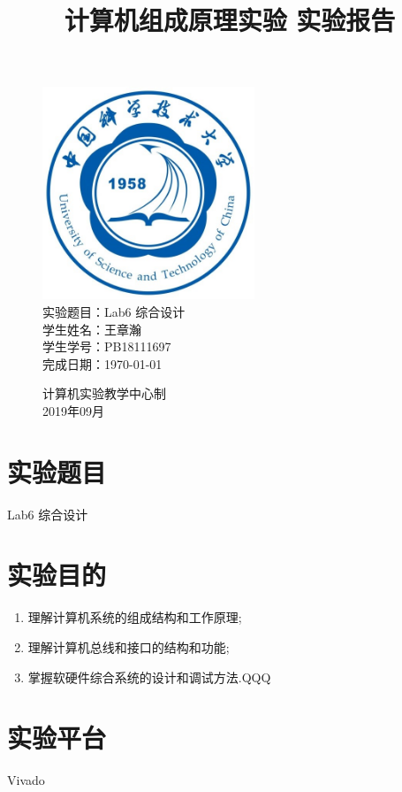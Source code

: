\documentclass[UTF8]{article}
\title{计算机组成原理实验 实验报告}
\date{}
\begin{document}
\maketitle
\begin{figure}[H]
	\centering
	\includegraphics[width=2.5in]{xiaohui.png}\vspace{0.5cm}\\
	\large{
		实验题目：Lab6 综合设计\\
		学生姓名：王章瀚\\
		学生学号：PB18111697\\
		完成日期：\today\\
	}\vspace{2cm}
	
	\large{计算机实验教学中心制\\2019年09月\\}
	\thispagestyle{empty}
	\clearpage  %
\end{figure}
\newpage

\section{实验题目}
Lab6 综合设计

\section{实验目的}
\begin{enumerate}
	\item 理解计算机系统的组成结构和工作原理;
	\item 理解计算机总线和接口的结构和功能;
	\item 掌握软硬件综合系统的设计和调试方法.QQQ
	
\end{enumerate}

\section{实验平台}
Vivado
\end{document}
